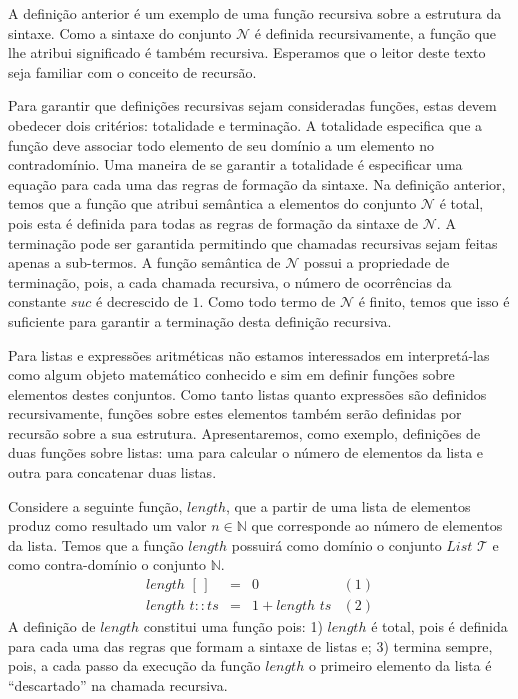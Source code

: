 A defini\c{c}\~ao anterior \'e um exemplo de uma fun\c{c}\~ao recursiva sobre a
estrutura da sintaxe. Como a sintaxe do conjunto $\mathcal{N}$ \'e definida recursivamente, a
fun\c{c}\~ao que lhe atribui significado \'e tamb\'em recursiva. Esperamos que o leitor deste texto
seja familiar com o conceito de recurs\~ao.

Para garantir que defini\c{c}\~oes recursivas sejam consideradas fun\c{c}\~oes, estas devem obedecer dois crit\'erios:
totalidade e termina\c{c}\~ao. A totalidade especifica que a fun\c{c}\~ao deve associar todo elemento de seu dom\'inio
a um elemento no contradom\'inio. Uma maneira de se garantir a totalidade \'e especificar uma equa\c{c}\~ao para cada uma
das regras de forma\c{c}\~ao da sintaxe. Na defini\c{c}\~ao anterior, temos que a fun\c{c}\~ao que atribui sem\^antica a
elementos do conjunto $\mathcal{N}$ \'e total, pois esta \'e definida para todas as regras de forma\c{c}\~ao da sintaxe de 
$\mathcal{N}$. A termina\c{c}\~ao pode ser garantida permitindo que chamadas recursivas sejam feitas apenas a sub-termos.
A fun\c{c}\~ao sem\^antica de $\mathcal{N}$ possui a propriedade de termina\c{c}\~ao, pois, a cada chamada recursiva, o 
n\'umero de ocorr\^encias da constante $suc$ \'e decrescido de $1$. Como todo termo de $\mathcal{N}$ \'e finito, temos que
isso \'e suficiente para garantir a termina\c{c}\~ao desta defini\c{c}\~ao recursiva.

Para listas e express\~oes aritm\'eticas n\~ao estamos interessados em interpret\'a-las como algum objeto matem\'atico conhecido
e sim em definir fun\c{c}\~oes sobre elementos destes conjuntos. Como tanto listas quanto express\~oes s\~ao definidos recursivamente,
fun\c{c}\~oes sobre estes elementos tamb\'em ser\~ao definidas por recurs\~ao sobre a sua estrutura. Apresentaremos, como exemplo, 
defini\c{c}\~oes de duas fun\c{c}\~oes sobre listas: uma para calcular o n\'umero de elementos da lista e outra para concatenar duas listas.

\begin{Definition}
Considere a seguinte fun\c{c}\~ao, $length$, que a partir de uma lista de elementos produz como resultado um valor $n\in\mathbb{N}$ que
corresponde ao n\'umero de elementos da lista. Temos que a fun\c{c}\~ao $length$ possuir\'a como dom\'inio o conjunto $\textit{List }\mathcal{T}$
e como contra-dom\'inio o conjunto $\mathbb{N}$.
\[
\begin{array}{lclr}
  length\,\,[\,] & = & 0 & (1)\\
  length\,\,t :: ts & = & 1 + length\,\, ts & (2)
\end{array}
\]
A defini\c{c}\~ao de $length$ constitui uma fun\c{c}\~ao pois: 1) $length$ \'e total, pois \'e definida para cada uma das regras que formam
a sintaxe de listas e; 3) termina sempre, pois, a cada passo da execu\c{c}\~ao da fun\c{c}\~ao $length$ o primeiro elemento da lista \'e
``descartado'' na chamada recursiva.
\end{Definition}

